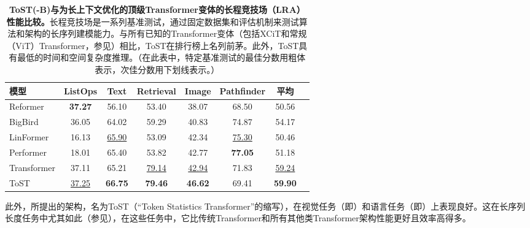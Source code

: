 \documentclass[../../book-main.tex]{subfiles}
\begin{document}
\begin{table}
    \centering
    
    \begin{tabular}{@{}lccccccc@{}}
            \toprule
            模型        & ListOps  & Text     & Retrieval & Image    & Pathfinder & 平均      \\
            \midrule
            \midrule
            Reformer              & \textbf{37.27} & 56.10             & 53.40              & 38.07             & 68.50               & 50.56             \\
            BigBird               & 36.05             & 64.02             & 59.29              & 40.83             & 74.87                & 54.17             \\
            LinFormer         & 16.13             & \underline{65.90} & 53.09              & 42.34             & \underline{75.30}               & 50.46             \\
            Performer             & 18.01             & 65.40             & 53.82              & 42.77             & \textbf{77.05}                & 51.18             \\
            Transformer           & 37.11             & 65.21             & \underline{79.14}              & \underline{42.94}             & 71.83              & \underline{59.24}            \\
            ToST & \underline{37.25}    & \textbf{66.75}    & \textbf{79.46}     & \textbf{46.62}    &    69.41      &     \textbf{59.90}\\
            
            \bottomrule
        \end{tabular}%
    \caption{\small \textbf{ToST(-B)与为长上下文优化的顶级Transformer变体的长程竞技场（LRA）性能比较。}长程竞技场是一系列基准测试，通过固定数据集和评估机制来测试算法和架构的长序列建模能力。与所有已知的Transformer变体（包括XCiT和常规（ViT）Transformer，参见）相比，ToST在排行榜上名列前茅。此外，ToST具有最低的时间和空间复杂度推理。（在此表中，特定基准测试的最佳分数用粗体表示，次佳分数用下划线表示。）}
    \label{tab:tost_lra_results}
\end{table}

此外，所提出的架构，名为ToST（“Token Statistics Transformer”的缩写），在视觉任务（即）和语言任务（即）上表现良好。这在长序列长度任务中尤其如此（参见），在这些任务中，它比传统Transformer和所有其他类Transformer架构性能更好且效率高得多。
\end{document}
